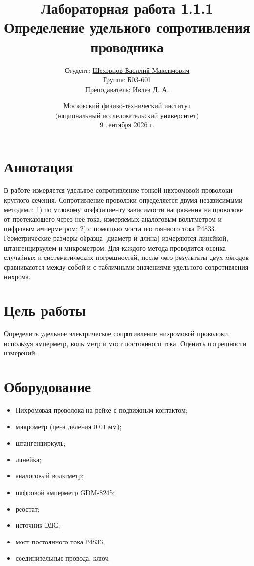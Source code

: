 \documentclass[12pt,a4paper]{article}
\title{\textbf{Лабораторная работа 1.1.1}\\
Определение удельного сопротивления проводника}
\author{
Студент: \underline{Шеховцов Василий Максимович}\\
Группа: \underline{Б03-601}\\
Преподаватель: \underline{Ивлев Д. А.}
}
\date{Московский физико-технический институт\\
(национальный исследовательский университет)\\
9 сентября 2026 г.\\}
\begin{document}
\maketitle

\section*{Аннотация}

В работе измеряется удельное сопротивление тонкой нихромовой проволоки
круглого сечения. Сопротивление проволоки определяется двумя независимыми
методами: 1) по угловому коэффициенту зависимости напряжения на проволоке
от протекающего через неё тока, измеряемых аналоговым вольтметром и
цифровым амперметром; 2) с помощью моста постоянного тока Р4833.
Геометрические размеры образца (диаметр и длина) измеряются линейкой,
штангенциркулем и микрометром. Для каждого метода проводится оценка
случайных и систематических погрешностей, после чего результаты двух
методов сравниваются между собой и с табличными значениями удельного
сопротивления нихрома.

\section*{Цель работы}

Определить удельное электрическое сопротивление нихромовой проволоки,
используя амперметр, вольтметр и мост постоянного тока. Оценить погрешности измерений.

\section*{Оборудование}

\begin{itemize}
    \item Нихромовая проволока на рейке с подвижным контактом;
    \item микрометр (цена деления $0.01$ мм);
    \item штангенциркуль;
    \item линейка;
    \item аналоговый вольтметр;
    \item цифровой амперметр GDM-8245;
    \item реостат;
    \item источник ЭДС;
    \item мост постоянного тока Р4833;
    \item соединительные провода, ключ.
\end{itemize}
\end{document}
